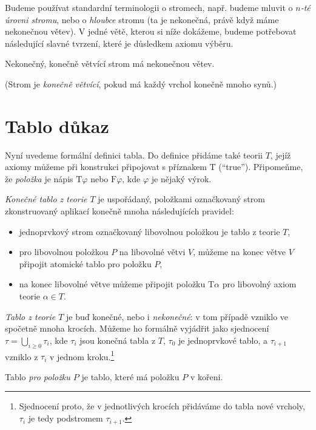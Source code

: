 Budeme používat standardní terminologii o stromech, např. budeme mluvit o \emph{$n$-té úrovni stromu}, nebo o \emph{hloubce} stromu (ta je nekonečná, právě když máme nekonečnou větev). V jedné větě, kterou si níže dokážeme, budeme potřebovat následující slavné tvrzení, které je důsledkem axiomu výběru. 

\begin{lemma}
Nekonečný, konečně větvící strom má nekonečnou větev.
\end{lemma}
\noindent (Strom je \emph{konečně větvící}, pokud má každý vrchol konečně mnoho synů.)


\section{Tablo důkaz}

Nyní uvedeme formální definici tabla. Do definice přidáme také teorii $T$, jejíž axiomy můžeme při konstrukci připojovat s příznakem $\mathrm{T}$ (``true''). Připomeňme, že \emph{položka} je nápis $\mathrm{T}\varphi$ nebo $\mathrm{F}\varphi$, kde $\varphi$ je nějaký výrok.

\begin{definition}[Tablo]
\emph{Konečné tablo z teorie $T$} je uspořádaný, položkami označkovaný strom zkonstruovaný aplikací konečně mnoha následujících pravidel:
\begin{itemize}
    \item jednoprvkový strom označkovaný libovolnou položkou je tablo z teorie $T$,
    \item pro libovolnou položkou $P$ na libovolné větvi $V$, můžeme na konec větve $V$ připojit atomické tablo pro položku $P$,
    \item na konec libovolné větve můžeme připojit položku $\mathrm{T}\alpha$ pro libovolný axiom teorie $\alpha\in T$.
\end{itemize}
\emph{Tablo z teorie $T$} je buď konečné, nebo i \emph{nekonečné}: v tom případě vzniklo ve spočetně mnoha krocích. Můžeme ho formálně vyjádřit jako sjednocení $\tau=\bigcup_{i\geq 0}\tau_i$, kde $\tau_i$ jsou konečná tabla z $T$, $\tau_0$ je jednoprvkové tablo, a $\tau_{i+1}$ vzniklo z $\tau_i$ v jednom kroku.\footnote{Sjednocení proto, že v jednotlivých krocích přidáváme do tabla nové vrcholy, $\tau_i$ je tedy podstromem $\tau_{i+1}$.}

Tablo \emph{pro položku $P$} je tablo, které má položku $P$ v kořeni.
\end{definition}

